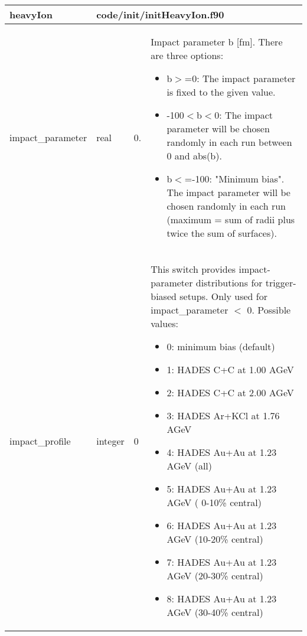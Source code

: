 \documentclass{article}
\begin{document}
\begin{longtable}{llll}
\toprule
\textbf{\large{heavyIon}} & \multicolumn{3}{l}{\footnotesize{code/init/initHeavyIon.f90}}\\*
\midrule
\endfirsthead
\midrule
\endhead
impact\_parameter & \begin{minipage}[t]{2cm}real\end{minipage} & \begin{minipage}[t]{2cm}0.\end{minipage} & \begin{minipage}[t]{12cm}Impact parameter b [fm]. There are three options:\begin{itemize}\leftmargin0em\itemindent0pt\item b$>$=0: The impact parameter is fixed to the given value.\item -100$<$b$<$0: The impact parameter will be chosen randomly in each run between 0 and abs(b).\item b$<$=-100: "Minimum bias". The impact parameter will be chosen randomly in each run (maximum = sum of radii plus twice the sum of surfaces).\end{itemize}\end{minipage}\\*
\midrule
impact\_profile & \begin{minipage}[t]{2cm}integer\end{minipage} & \begin{minipage}[t]{2cm}0\end{minipage} & \begin{minipage}[t]{12cm}This switch provides impact-parameter distributions for trigger-biased setups. Only used for impact\_parameter $<$ 0. Possible values:\begin{itemize}\leftmargin0em\itemindent0pt\item 0: minimum bias (default)\item 1: HADES C+C    at 1.00 AGeV\item 2: HADES C+C    at 2.00 AGeV\item 3: HADES Ar+KCl at 1.76 AGeV\item 4: HADES Au+Au  at 1.23 AGeV (all)\item 5: HADES Au+Au  at 1.23 AGeV ( 0-10\% central)\item 6: HADES Au+Au  at 1.23 AGeV (10-20\% central)\item 7: HADES Au+Au  at 1.23 AGeV (20-30\% central)\item 8: HADES Au+Au  at 1.23 AGeV (30-40\% central)\end{itemize}\end{minipage}\\*

\end{longtable}
\end{document}
